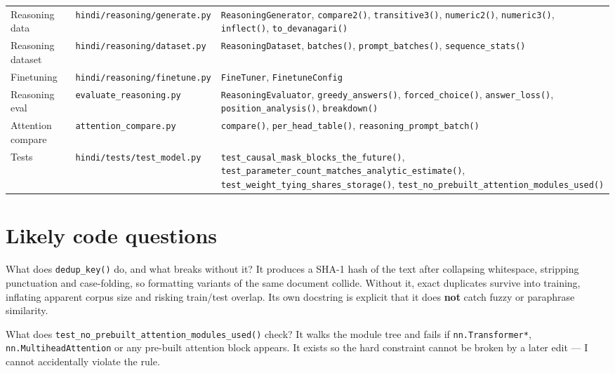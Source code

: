 \documentclass[11pt]{report}
\begin{document}
\begin{longtable}{@{}p{2.6cm}p{4.4cm}p{7.4cm}@{}}
Reasoning data & \texttt{hindi/reasoning/generate.py} & \texttt{ReasoningGenerator}, \texttt{compare2()}, \texttt{transitive3()}, \texttt{numeric2()}, \texttt{numeric3()}, \texttt{inflect()}, \texttt{to\_devanagari()} \\
Reasoning dataset & \texttt{hindi/reasoning/dataset.py} & \texttt{ReasoningDataset}, \texttt{batches()}, \texttt{prompt\_batches()}, \texttt{sequence\_stats()} \\
Finetuning & \texttt{hindi/reasoning/finetune.py} & \texttt{FineTuner}, \texttt{FinetuneConfig} \\
Reasoning eval & \texttt{evaluate\_reasoning.py} & \texttt{ReasoningEvaluator}, \texttt{greedy\_answers()}, \texttt{forced\_choice()}, \texttt{answer\_loss()}, \texttt{position\_analysis()}, \texttt{breakdown()} \\
Attention compare & \texttt{attention\_compare.py} & \texttt{compare()}, \texttt{per\_head\_table()}, \texttt{reasoning\_prompt\_batch()} \\
Tests & \texttt{hindi/tests/test\_model.py} & \texttt{test\_causal\_mask\_blocks\_the\_future()}, \texttt{test\_parameter\_count\_matches\_analytic\_estimate()}, \texttt{test\_weight\_tying\_shares\_storage()}, \texttt{test\_no\_prebuilt\_attention\_modules\_used()} \\
\bottomrule
\end{longtable}

\section{Likely code questions}

\begin{qabox}{What does \texttt{dedup\_key()} do, and what breaks without it?}
It produces a SHA-1 hash of the text after collapsing whitespace, stripping
punctuation and case-folding, so formatting variants of the same document
collide. Without it, exact duplicates survive into training, inflating apparent
corpus size and risking train/test overlap. Its own docstring is explicit that
it does \textbf{not} catch fuzzy or paraphrase similarity.
\end{qabox}

\begin{qabox}{What does \texttt{test\_no\_prebuilt\_attention\_modules\_used()} check?}
It walks the module tree and fails if \texttt{nn.Transformer*},
\texttt{nn.MultiheadAttention} or any pre-built attention block appears. It
exists so the hard constraint cannot be broken by a later edit --- I cannot
accidentally violate the rule.
\end{qabox}
\end{document}
